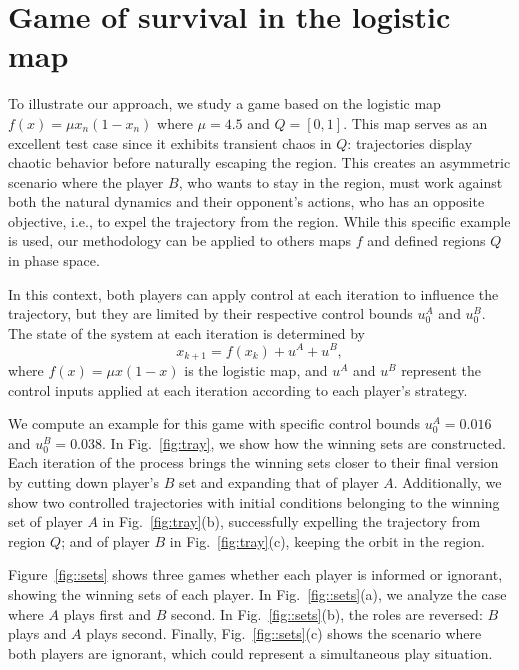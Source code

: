 \section{Game of survival in the logistic map}



To illustrate our approach, we study a game based on the logistic map ${f(x) = \mu x_n(1-x_n)}$ where $\mu=4.5$ and $Q=[0,1]$. This map serves as an excellent test case since it exhibits transient chaos in $Q$: trajectories display chaotic behavior before naturally escaping the region. This creates an asymmetric scenario where the player $B$, who wants to stay in the region, must work against both the natural dynamics and their opponent's actions, who has an opposite objective, i.e., to expel the trajectory from the region. While this specific example is used, our methodology can be applied to others maps $f$ and defined regions $Q$ in phase space.

In this context, both players can apply control at each iteration to influence the trajectory, but they are limited by their respective control bounds $u_0^A$ and $u_0^B$. The state of the system at each iteration is determined by
\begin{equation}
x_{k+1} = f(x_k) + u^A + u^B,
\end{equation}
where $f(x) = \mu x(1-x)$ is the logistic map, and $u^A$ and $u^B$ represent the control inputs applied at each iteration according to each player's strategy.






We compute an example for this game with specific control bounds $u_0^A = 0.016$ and $u_0^B = 0.038$. In Fig.~\ref{fig:tray}, we show how the winning sets are constructed. Each iteration of the process brings the winning sets closer to their final version by cutting down player's $B$ set and expanding that of player $A$. Additionally, we show two controlled trajectories with initial conditions belonging to the winning set of player $A$ in Fig.~\ref{fig:tray}(b), successfully expelling the trajectory from region $Q$; and of player $B$ in Fig.~\ref{fig:tray}(c), keeping the orbit in the region. 

Figure~\ref{fig::sets} shows three games whether each player is informed or ignorant, showing the winning sets of each player. In Fig.~\ref{fig::sets}(a), we analyze the case where $A$ plays first and $B$ second. In Fig.~\ref{fig::sets}(b), the roles are reversed: $B$ plays and $A$ plays second. Finally, Fig.~\ref{fig::sets}(c) shows the scenario where both players are ignorant, which could represent a simultaneous play situation.

